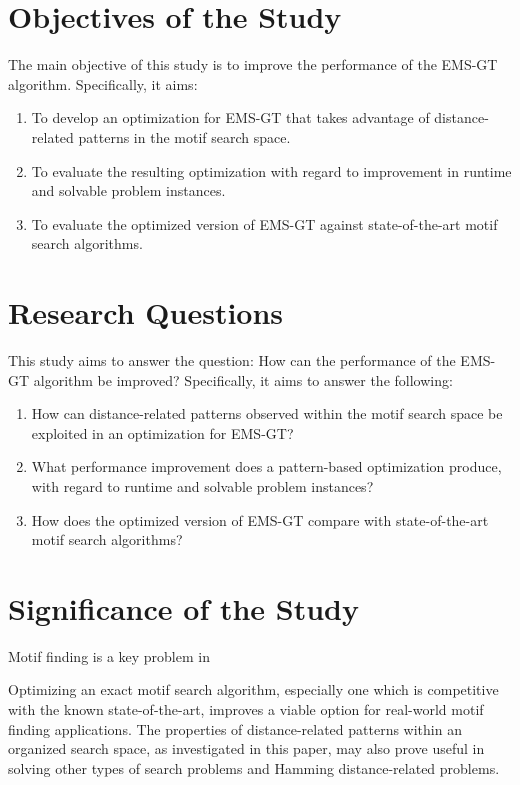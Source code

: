 \documentclass[oneside,12pt]{DISCSthesis}
\begin{document}
	\section{Objectives of the Study}
		The main objective of this study is to improve the performance of the EMS-GT algorithm. Specifically, it aims:
		\begin{enumerate}
		\item To develop an optimization for EMS-GT that takes advantage of distance-related patterns in the motif search space.
		\item To evaluate the resulting optimization with regard to improvement in runtime and solvable problem instances.
		\item To evaluate the optimized version of EMS-GT against state-of-the-art motif search algorithms.
		\end{enumerate}

	\section{Research Questions}
		This study aims to answer the question: How can the performance of the EMS-GT algorithm be improved?
		Specifically, it aims to answer the following:

		\begin{enumerate}
		\item How can distance-related patterns observed within the motif search space be exploited in an optimization for EMS-GT?
		\item What performance improvement does a pattern-based optimization produce, with regard to runtime and solvable problem instances?
		\item How does the optimized version of EMS-GT compare with state-of-the-art motif search algorithms?
		\end{enumerate}

	\section{Significance of the Study}
		Motif finding is a key problem in 

		Optimizing an exact motif search algorithm, especially one which is competitive with the known state-of-the-art, improves a viable option for real-world motif finding applications. The properties of distance-related patterns within an organized search space, as investigated in this paper, may also prove useful in solving other types of search problems and Hamming distance-related problems.
\end{document}
